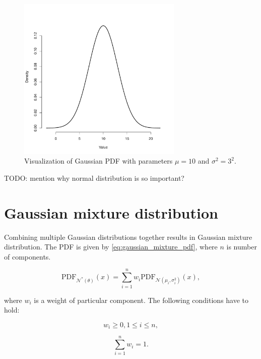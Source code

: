 \documentclass[thesis=B,english]{FITthesis}[2012/06/26]
\begin{document}
\begin{figure}
	\centering
 	\includegraphics[width=0.7\textwidth]{gaussian}
 	\caption{Visualization of Gaussian PDF with parameters $\mu=10$ and $\sigma^2=3^2$.}
 	\label{fig:gaussian}
\end{figure}

TODO: mention why normal distribution is so important?

\section{Gaussian mixture distribution}

Combining multiple Gaussian distributions together results in Gaussian mixture distribution. The PDF is given by \ref{eq:gaussian_mixture_pdf}, where $n$ is number of components.

\begin{equation} \label{eq:gaussian_mixture_pdf}
\text{PDF}_{\mathcal{N}^*(\theta)}(x) = \sum_{i=1}^n w_i \text{PDF}_{\mathcal{N}(\mu_i,\sigma^2_i)}(x),
\end{equation}

where $w_i$ is a weight of particular component. The following conditions have to hold:

\begin{equation}
w_i \geq 0, 1 \leq i \leq n,
\end{equation}

\begin{equation}
\sum_{i=1}^n w_i = 1.
\end{equation}
\end{document}
